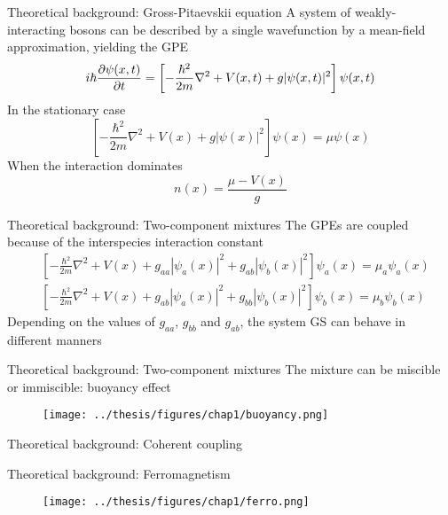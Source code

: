 \documentclass[handout]{beamer}
\begin{document}
\begin{frame}{Theoretical background: Gross-Pitaevskii equation}
    A system of weakly-interacting bosons can be described by a single wavefunction by a mean-field approximation, yielding the GPE
    \begin{equation*}
        i\hbar \pdv{\psi(x,t)}{t} = \left[ 
            -\frac{\hbar^2}{2m}\nabla^2 + V(x,t) + g|\psi(x,t)|^2
        \right] \psi(x,t)
    \end{equation*}
    In the stationary case
    \begin{equation*}
        \left[ 
            -\frac{\hbar^2}{2m}\nabla^2 + V(x) + g|\psi(x)|^2
        \right] \psi(x) = \mu \psi(x)
    \end{equation*}
    When the interaction dominates
    \begin{equation*}
        n(x) = \frac{\mu - V(x)}{g}
    \end{equation*}
\end{frame}

\begin{frame}{Theoretical background: Two-component mixtures}
    The GPEs are coupled because of the interspecies interaction constant
    \begin{align*}
        &\left[ -\frac{\hbar^2}{2m}\nabla^2 + V(x) + g_{aa}|\psi_a(x)|^2 + g_{ab}|\psi_b(x)|^2
        \right] \psi_a(x) = \mu_a \psi_a(x) \\
        &\left[ -\frac{\hbar^2}{2m}\nabla^2 + V(x) + g_{ab}|\psi_a(x)|^2 + g_{bb}|\psi_b(x)|^2
        \right] \psi_b(x) = \mu_b \psi_b(x)
    \end{align*}
    Depending on the values of $g_{aa}$, $g_{bb}$ and $g_{ab}$, the system GS can behave in different manners
\end{frame}

\begin{frame}{Theoretical background: Two-component mixtures}
    The mixture can be miscible or immiscible: buoyancy effect
    \begin{figure}
        \centering
        \texttt{[image: ../thesis/figures/chap1/buoyancy.png]}
    \end{figure}
\end{frame}

\begin{frame}{Theoretical background: Coherent coupling}
    
\end{frame}

\begin{frame}{Theoretical background: Ferromagnetism}
    \begin{figure}
        \centering
        \texttt{[image: ../thesis/figures/chap1/ferro.png]}
    \end{figure}
\end{frame}
\end{document}
